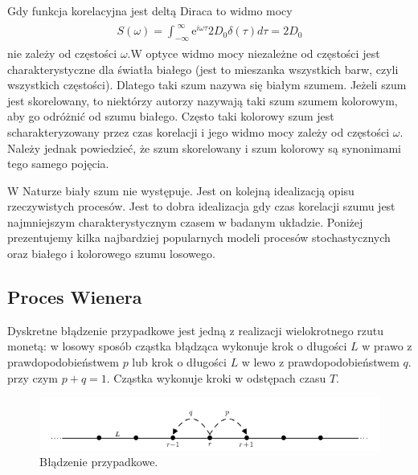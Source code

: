 \documentclass[a4paper,12pt,polish]{sphinxmanual}
\begin{document}
Gdy funkcja korelacyjna jest deltą Diraca to widmo mocy
\label{ch3/chIII021:equation-eqn5}\begin{gather}
\begin{split}S(\omega) = \int_{-\infty}^{ \; \infty} \mbox{e}^{i\omega \tau} 2D_0 \delta(\tau) d\tau = 2 D_0\end{split}\label{ch3/chIII021-eqn5}
\end{gather}
nie zależy od częstości $\omega$.W optyce widmo mocy niezależne od częstości jest charakterystyczne dla światła białego (jest to mieszanka wszystkich barw, czyli wszystkich częstości). Dlatego taki szum nazywa się białym szumem. Jeżeli szum jest skorelowany, to niektórzy autorzy nazywają taki szum szumem kolorowym, aby go odróżnić od szumu białego. Często taki kolorowy szum jest scharakteryzowany przez czas korelacji i jego widmo mocy zależy od częstości $\omega$. Należy jednak powiedzieć, że szum skorelowany i szum kolorowy są synonimami tego samego pojęcia.

W Naturze biały szum nie występuje. Jest on kolejną idealizacją opisu rzeczywistych procesów. Jest to dobra idealizacja gdy czas korelacji szumu jest najmniejszym charakterystycznym czasem w badanym układzie. Poniżej prezentujemy kilka najbardziej popularnych modeli procesów stochastycznych oraz białego i kolorowego szumu losowego.


\subsection{Proces Wienera}
\label{ch3/chIII021:proces-wienera}
Dyskretne błądzenie przypadkowe jest jedną z realizacji wielokrotnego rzutu monetą: w losowy sposób cząstka błądząca wykonuje krok o długości $L$ w prawo z prawdopodobieństwem $p$ lub krok o długości $L$ w lewo z prawdopodobieństwem $q$. przy czym $p+q=1$. Cząstka wykonuje kroki w odstępach czasu $T$.
\begin{figure}[htbp]
\centering
\capstart

\includegraphics[width=0.800\linewidth]{randomwalk.png}
\caption{Błądzenie przypadkowe.}\end{figure}
\end{document}
